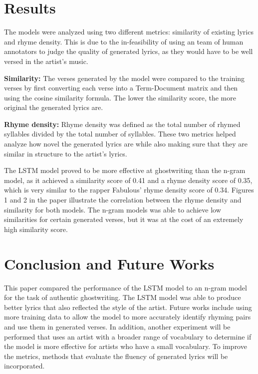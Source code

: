 \documentclass{article}
\begin{document}
\section{Results}
The models were analyzed using two different metrics: similarity of existing lyrics and rhyme density. This is due to the in-feasibility of using an team of human annotators to judge the quality of generated lyrics, as they would have to be well versed in the artist's music. 

\textbf{Similarity:} The verses generated by the model were compared to the training verses by first converting each verse into a Term-Document matrix and then using the cosine similarity formula. The lower the similarity score, the more original the generated lyrics are. 

\textbf{Rhyme density:} Rhyme density was defined as the total number of rhymed syllables divided by the total number of syllables. These two metrics helped analyze how novel the generated lyrics are while also making sure that they are similar in structure to the artist's lyrics. 

The LSTM model proved to be more effective at ghostwriting than the n-gram model, as it achieved a similarity score of 0.41 and a rhyme density score of 0.35, which is very similar to the rapper Fabulous' rhyme density score of 0.34. Figures 1 and 2 in the paper illustrate the correlation between the rhyme density and similarity for both models. The n-gram models was able to achieve low similarities for certain generated verses, but it was at the cost of an extremely high similarity score.

\section{Conclusion and Future Works}
This paper compared the performance of the LSTM model to an n-gram model for the task of authentic ghostwriting. The LSTM model was able to produce better lyrics that also reflected the style of the artist. Future works include using more training data to allow the model to more accurately identify rhyming pairs and use them in generated verses. In addition, another experiment will be performed that uses an artist with a broader range of vocabulary to determine if the model is more effective for artists who have a small vocabulary. To improve the metrics, methods that evaluate the fluency of generated lyrics will be incorporated. 
\end{document}
